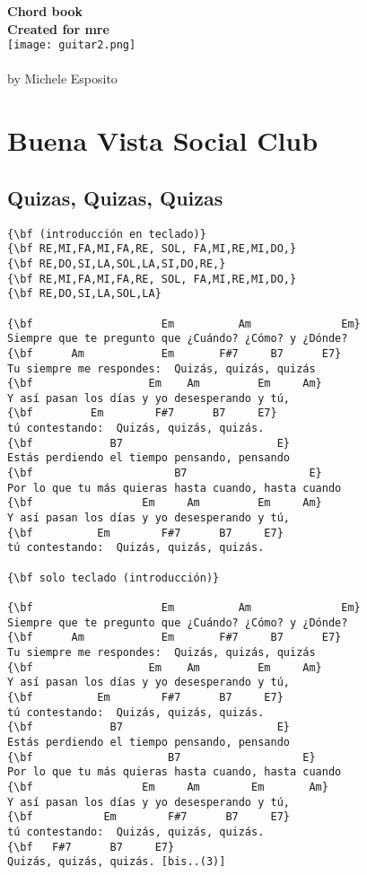 \documentclass[a4paper]{article}
\begin{document}
\begin{center}
\vspace{3cm}
{\bf{\huge Chord book }}\\
\vspace{2cm}
{\bf Created for mre}\\\vspace{2cm}
\texttt{[image: guitar2.png]}\\
\vspace{1cm}
\\
by Michele Esposito \\
\end{center}

\newpage
\tableofcontents
\newpage

\section{Buena Vista Social Club}
\subsection{Quizas, Quizas, Quizas}
\begin{Verbatim}[commandchars=\\\{\}]
{\bf (introducción en teclado)}
{\bf RE,MI,FA,MI,FA,RE, SOL, FA,MI,RE,MI,DO,}
{\bf RE,DO,SI,LA,SOL,LA,SI,DO,RE,}
{\bf RE,MI,FA,MI,FA,RE, SOL, FA,MI,RE,MI,DO,}
{\bf RE,DO,SI,LA,SOL,LA}

{\bf                    Em          Am              Em}
Siempre que te pregunto que ¿Cuándo? ¿Cómo? y ¿Dónde?
{\bf      Am            Em       F#7     B7      E7}
Tu siempre me respondes:  Quizás, quizás, quizás
{\bf                  Em    Am         Em     Am}
Y así pasan los días y yo desesperando y tú,
{\bf         Em        F#7      B7     E7}
tú contestando:  Quizás, quizás, quizás.
{\bf            B7                        E}
Estás perdiendo el tiempo pensando, pensando
{\bf                      B7                   E}
Por lo que tu más quieras hasta cuando, hasta cuando
{\bf                 Em     Am         Em     Am}
Y así pasan los días y yo desesperando y tú,
{\bf          Em        F#7      B7     E7}
tú contestando:  Quizás, quizás, quizás.

{\bf solo teclado (introducción)}

{\bf                    Em          Am              Em}
Siempre que te pregunto que ¿Cuándo? ¿Cómo? y ¿Dónde?
{\bf      Am            Em       F#7     B7      E7}
Tu siempre me respondes:  Quizás, quizás, quizás
{\bf                  Em    Am         Em     Am}
Y así pasan los días y yo desesperando y tú,
{\bf          Em        F#7      B7     E7}
tú contestando:  Quizás, quizás, quizás.
{\bf            B7                        E}
Estás perdiendo el tiempo pensando, pensando
{\bf                     B7                   E}
Por lo que tu más quieras hasta cuando, hasta cuando
{\bf                 Em     Am        Em       Am}
Y así pasan los días y yo desesperando y tú,
{\bf           Em        F#7      B7     E7}
tú contestando:  Quizás, quizás, quizás.
{\bf   F#7      B7     E7}
Quizás, quizás, quizás. [bis..(3)]

\end{Verbatim}
\newpage
\end{document}
